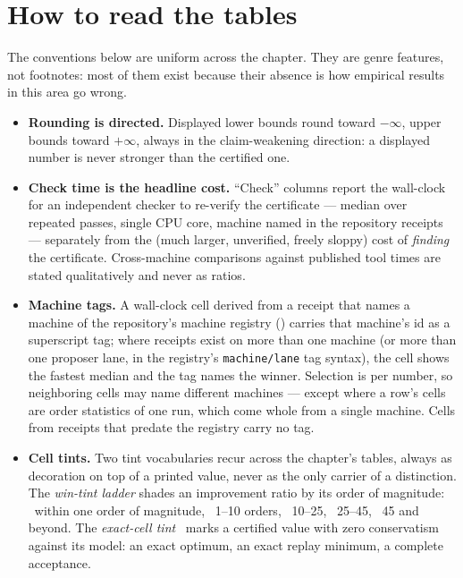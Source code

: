 \section{How to read the tables}
\label{sec:exp-conventions}

The conventions below are uniform across the chapter. They are genre
features, not footnotes: most of them exist because their absence is
how empirical results in this area go wrong.

\begin{itemize}
\item \textbf{Rounding is directed.} Displayed lower bounds round
  toward $-\infty$, upper bounds toward $+\infty$, always in the
  claim-weakening direction: a displayed number is never stronger than
  the certified one.
\item \textbf{Check time is the headline cost.} ``Check'' columns
  report the wall-clock for an independent checker to re-verify the
  certificate --- median over repeated passes, single CPU core, machine
  named in the repository receipts --- separately from the (much
  larger, unverified, freely sloppy) cost of \emph{finding} the
  certificate. Cross-machine comparisons against published tool times
  are stated qualitatively and never as ratios.
\item \textbf{Machine tags.} A wall-clock cell derived from a receipt
  that names a machine of the repository's machine registry
  () carries that machine's id as a superscript tag;
  where receipts exist on more than one machine (or more than one
  proposer lane, in the registry's \texttt{machine/lane} tag syntax),
  the cell shows the fastest median and the tag names the winner.
  Selection is per number, so neighboring cells may name different
  machines --- except where a row's cells are order statistics of one
  run, which come whole from a single machine. Cells from receipts
  that predate the registry carry no tag.
\item \textbf{Cell tints.} Two tint vocabularies recur across the
  chapter's tables, always as decoration on top of a printed value,
  never as the only carrier of a distinction. The \emph{win-tint
  ladder} shades an improvement ratio by its order of magnitude:
  ~within one order of magnitude, ~1--10 orders,
  ~10--25, ~25--45, ~45 and beyond.
  The \emph{exact-cell tint} ~marks a certified value
  with zero conservatism against its model: an exact optimum, an
  exact replay minimum, a complete acceptance.

\end{itemize}
